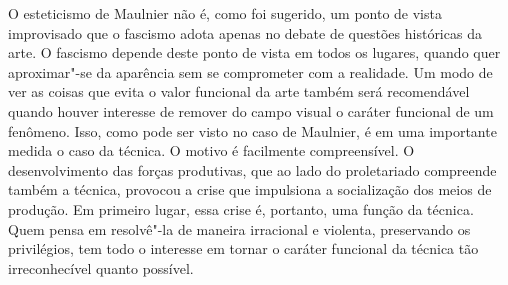 O esteticismo de Maulnier não é, como foi sugerido, um ponto de vista
improvisado que o fascismo adota apenas no debate de questões históricas
da arte. O fascismo depende deste ponto de vista em todos os lugares,
quando quer aproximar"-se da aparência sem se comprometer com a
realidade. Um modo de ver as coisas que evita o valor funcional da arte
também será recomendável quando houver interesse de remover do campo
visual o caráter funcional de um fenômeno. Isso, como pode ser visto no
caso de Maulnier, é em uma importante medida o caso da técnica. O motivo
é facilmente compreensível. O desenvolvimento das forças produtivas, que
ao lado do proletariado compreende também a técnica, provocou a crise
que impulsiona a socialização dos meios de produção. Em primeiro lugar,
essa crise é, portanto, uma função da técnica. Quem pensa em resolvê"-la
de maneira irracional e violenta, preservando os privilégios, tem todo o
interesse em tornar o caráter funcional da técnica tão irreconhecível
quanto possível.

